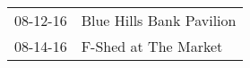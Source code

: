 \begin{supertabular}{p{0.25\columnwidth}p{0.75\columnwidth}}
 08-12-16 &  Blue Hills Bank Pavilion \\
 08-14-16 &      F-Shed at The Market \\
\end{supertabular}
